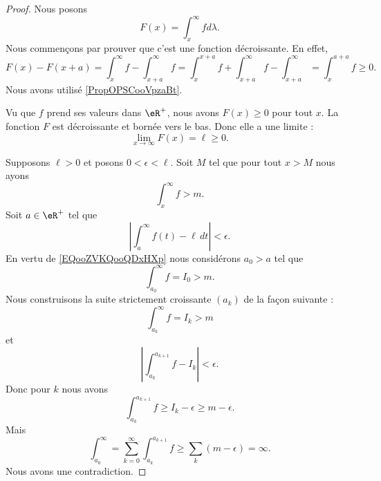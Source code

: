 \begin{proof}
    Nous posons
    \begin{equation}
        F(x)= \int_x^{\infty}fd\lambda.
    \end{equation}
    Nous commençons par prouver que c'est une fonction décroissante. En effet,
    \begin{equation}
        F(x)-F(x+a)=\int_{x}^{\infty}f-\int_{x+a}^{\infty}f=\int_{x}^{x+a}f+\int_{x+a}^{\infty}f-\int_{x+a}^{\infty}=\int_x^{a+a}f\geq 0.
    \end{equation}
    Nous avons utilisé \ref{PropOPSCooVpzaBt}.

    Vu que \( f\) prend ses valeurs dans \( \eR^+\), nous avons \( F(x)\geq 0\) pour tout \( x\). La fonction \( F\) est décroissante et bornée vers le bas. Donc elle a une limite :
    \begin{equation}
        \lim_{x\to \infty} F(x)=\ell\geq 0.
    \end{equation}
    
    Supposons \( \ell >0\) et posons \( 0<\epsilon<\ell\). Soit \( M\) tel que pour tout \( x>M\) nous ayons
    \begin{equation}        \label{EQooZVKQooQDxHXp}
        \int_x^{\infty}f>m.
    \end{equation}
    Soit \( a\in \eR^+\) tel que
    \begin{equation}
        | \int_a^{\infty}f(t)-\ell\,dt |<\epsilon.
    \end{equation}
    En vertu de \eqref{EQooZVKQooQDxHXp} nous considérons \( a_0>a\) tel que 
    \begin{equation}
        \int_{a_0}^{\infty}f=I_0>m.
    \end{equation}
    Nous construisons la suite strictement croissante \( (a_k)\) de la façon suivante :
    \begin{equation}
        \int_{a_k}^{\infty}f=I_k>m
    \end{equation}
    et
    \begin{equation}
        | \int_{a_k}^{a_{k+1}}f-I_k |<\epsilon.
    \end{equation}
    Donc pour \( k\) nous avons
    \begin{equation}
        \int_{a_k}^{a_{k+1}}f\geq I_k-\epsilon\geq m-\epsilon.
    \end{equation}
    Mais
    \begin{equation}
        \int_{a_0}^{\infty}=\sum_{k=0}^{\infty}\int_{a_k}^{a_{k+1}}f\geq \sum_k(m-\epsilon)=\infty.
    \end{equation}
    Nous avons une contradiction.
\end{proof}

